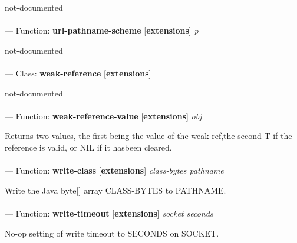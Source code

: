 \begin{adjustwidth}{5em}{5em}
not-documented
\end{adjustwidth}

\paragraph{}
\label{EXTENSIONS:URL-PATHNAME-SCHEME}
--- Function: \textbf{url-pathname-scheme} [\textbf{extensions}] \textit{p}

\begin{adjustwidth}{5em}{5em}
not-documented
\end{adjustwidth}

\paragraph{}
\label{EXTENSIONS:WEAK-REFERENCE}
--- Class: \textbf{weak-reference} [\textbf{extensions}] \textit{}

\begin{adjustwidth}{5em}{5em}
not-documented
\end{adjustwidth}

\paragraph{}
\label{EXTENSIONS:WEAK-REFERENCE-VALUE}
--- Function: \textbf{weak-reference-value} [\textbf{extensions}] \textit{obj}

\begin{adjustwidth}{5em}{5em}
Returns two values, the first being the value of the weak ref,the second T if the reference is valid, or NIL if it hasbeen cleared.
\end{adjustwidth}

\paragraph{}
\label{EXTENSIONS:WRITE-CLASS}
--- Function: \textbf{write-class} [\textbf{extensions}] \textit{class-bytes pathname}

\begin{adjustwidth}{5em}{5em}
Write the Java byte[] array CLASS-BYTES to PATHNAME.
\end{adjustwidth}

\paragraph{}
\label{EXTENSIONS:WRITE-TIMEOUT}
--- Function: \textbf{write-timeout} [\textbf{extensions}] \textit{socket seconds}

\begin{adjustwidth}{5em}{5em}
No-op setting of write timeout to SECONDS on SOCKET.
\end{adjustwidth}

